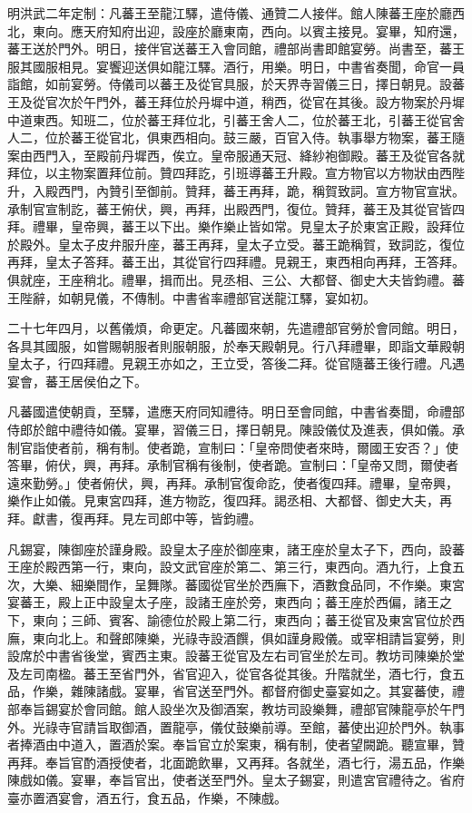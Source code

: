 明洪武二年定制：凡蕃王至龍江驛，遣侍儀、通贊二人接伴。館人陳蕃王座於廳西北，東向。應天府知府出迎，設座於廳東南，西向。以賓主接見。宴畢，知府還，蕃王送於門外。明日，接伴官送蕃王入會同館，禮部尚書即館宴勞。尚書至，蕃王服其國服相見。宴饗迎送俱如龍江驛。酒行，用樂。明日，中書省奏聞，命官一員詣館，如前宴勞。侍儀司以蕃王及從官具服，於天界寺習儀三日，擇日朝見。設蕃王及從官次於午門外，蕃王拜位於丹墀中道，稍西，從官在其後。設方物案於丹墀中道東西。知班二，位於蕃王拜位北，引蕃王舍人二，位於蕃王北，引蕃王從官舍人二，位於蕃王從官北，俱東西相向。鼓三嚴，百官入侍。執事舉方物案，蕃王隨案由西門入，至殿前丹墀西，俟立。皇帝服通天冠、絳紗袍御殿。蕃王及從官各就拜位，以主物案置拜位前。贊四拜訖，引班導蕃王升殿。宣方物官以方物狀由西陛升，入殿西門，內贊引至御前。贊拜，蕃王再拜，跪，稱賀致詞。宣方物官宣狀。承制官宣制訖，蕃王俯伏，興，再拜，出殿西門，復位。贊拜，蕃王及其從官皆四拜。禮畢，皇帝興，蕃王以下出。樂作樂止皆如常。見皇太子於東宮正殿，設拜位於殿外。皇太子皮弁服升座，蕃王再拜，皇太子立受。蕃王跪稱賀，致詞訖，復位再拜，皇太子答拜。蕃王出，其從官行四拜禮。見親王，東西相向再拜，王答拜。俱就座，王座稍北。禮畢，揖而出。見丞相、三公、大都督、御史大夫皆鈞禮。蕃王陛辭，如朝見儀，不傳制。中書省率禮部官送龍江驛，宴如初。

二十七年四月，以舊儀煩，命更定。凡蕃國來朝，先遣禮部官勞於會同館。明日，各具其國服，如嘗賜朝服者則服朝服，於奉天殿朝見。行八拜禮畢，即詣文華殿朝皇太子，行四拜禮。見親王亦如之，王立受，答後二拜。從官隨蕃王後行禮。凡遇宴會，蕃王居侯伯之下。

凡蕃國遣使朝貢，至驛，遣應天府同知禮待。明日至會同館，中書省奏聞，命禮部侍郎於館中禮待如儀。宴畢，習儀三日，擇日朝見。陳設儀仗及進表，俱如儀。承制官詣使者前，稱有制。使者跪，宣制曰：「皇帝問使者來時，爾國王安否？」使答畢，俯伏，興，再拜。承制官稱有後制，使者跪。宣制曰：「皇帝又問，爾使者遠來勤勞。」使者俯伏，興，再拜。承制官復命訖，使者復四拜。禮畢，皇帝興，樂作止如儀。見東宮四拜，進方物訖，復四拜。謁丞相、大都督、御史大夫，再拜。獻書，復再拜。見左司郎中等，皆鈞禮。

凡錫宴，陳御座於謹身殿。設皇太子座於御座東，諸王座於皇太子下，西向，設蕃王座於殿西第一行，東向，設文武官座於第二、第三行，東西向。酒九行，上食五次，大樂、細樂間作，呈舞隊。蕃國從官坐於西廡下，酒數食品同，不作樂。東宮宴蕃王，殿上正中設皇太子座，設諸王座於旁，東西向；蕃王座於西偏，諸王之下，東向；三師、賓客、諭德位於殿上第二行，東西向；蕃王從官及東宮官位於西廡，東向北上。和聲郎陳樂，光祿寺設酒饌，俱如謹身殿儀。或宰相請旨宴勞，則設席於中書省後堂，賓西主東。設蕃王從官及左右司官坐於左司。教坊司陳樂於堂及左司南楹。蕃王至省門外，省官迎入，從官各從其後。升階就坐，酒七行，食五品，作樂，雜陳諸戲。宴畢，省官送至門外。都督府御史臺宴如之。其宴蕃使，禮部奉旨錫宴於會同館。館人設坐次及御酒案，教坊司設樂舞，禮部官陳龍亭於午門外。光祿寺官請旨取御酒，置龍亭，儀仗鼓樂前導。至館，蕃使出迎於門外。執事者捧酒由中道入，置酒於案。奉旨官立於案東，稱有制，使者望闕跪。聽宣畢，贊再拜。奉旨官酌酒授使者，北面跪飲畢，又再拜。各就坐，酒七行，湯五品，作樂陳戲如儀。宴畢，奉旨官出，使者送至門外。皇太子錫宴，則遣宮官禮待之。省府臺亦置酒宴會，酒五行，食五品，作樂，不陳戲。

